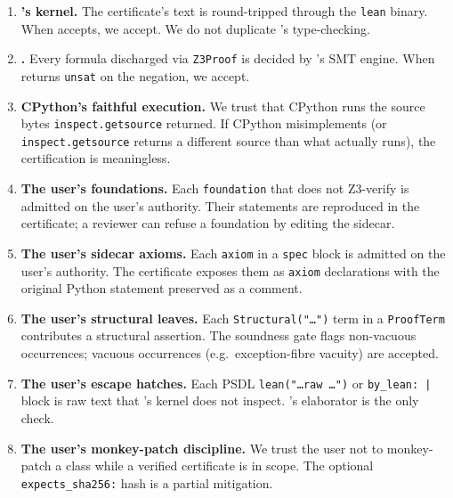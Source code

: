 \begin{enumerate}[leftmargin=1.7em]
  \item \textbf{\Lean{}'s kernel.}  The certificate's \Lean{} text
    is round-tripped through the \texttt{lean} binary.  When
    \Lean{} accepts, we accept.  We do not duplicate \Lean{}'s
    type-checking.

  \item \textbf{\Zthree.}  Every formula discharged via
    \texttt{Z3Proof} is decided by \Zthree's SMT engine.  When
    \Zthree{} returns \texttt{unsat} on the negation, we accept.

  \item \textbf{CPython's faithful execution.}  We trust that
    CPython runs the source bytes \texttt{inspect.getsource}
    returned.  If CPython misimplements (or
    \texttt{inspect.getsource} returns a different source than what
    actually runs), the certification is meaningless.

  \item \textbf{The user's foundations.}  Each
    \texttt{foundation} that does not Z3-verify is admitted on
    the user's authority.  Their statements are reproduced in the
    certificate; a reviewer can refuse a foundation by editing the
    sidecar.

  \item \textbf{The user's sidecar axioms.}  Each \texttt{axiom}
    in a \texttt{spec} block is admitted on the user's authority.
    The certificate exposes them as \Lean{} \texttt{axiom}
    declarations with the original Python statement preserved as
    a comment.

  \item \textbf{The user's structural leaves.}  Each
    \texttt{Structural("\dots")} term in a \texttt{ProofTerm}
    contributes a structural assertion.  The soundness gate
    flags non-vacuous occurrences; vacuous occurrences (e.g.\
    exception-fibre vacuity) are accepted.

  \item \textbf{The user's escape hatches.}  Each PSDL
    \texttt{lean("\dots raw \dots")} or \texttt{by\_lean: |}
    block is raw \Lean{} text that \Deppy{}'s kernel does not
    inspect.  \Lean{}'s elaborator is the only check.

  \item \textbf{The user's monkey-patch discipline.}  We trust
    the user not to monkey-patch a class while a verified
    certificate is in scope.  The optional
    \texttt{expects\_sha256:} hash is a partial mitigation.
\end{enumerate}

